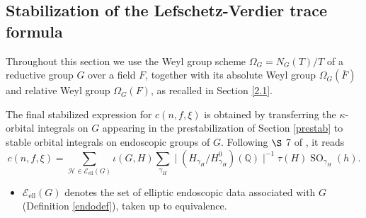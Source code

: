 \documentclass[11pt,a4paper]{article}
\newcommand{\Eell}{\mathcal{E}_{\mathrm{ell}}}
\theoremstyle{definition}
\theoremstyle{plain}
\theoremstyle{remark}
\theoremstyle{plain}
\DeclareMathOperator{\SO}{SO}
\begin{document}
\subsection{Stabilization of the Lefschetz-Verdier trace formula}\label{stab}
Throughout this section we use the Weyl group scheme $\Omega_G = N_G(T)/T$ of a reductive group $G$ over a field $F$, together with its absolute Weyl group $\Omega_G(\overline{F})$ and relative Weyl group $\Omega_G(F)$, as recalled in Section \ref{2.1}.

The final stabilized expression for $c(n,f,\xi)$ is obtained by transferring the $\kappa$-orbital integrals on $G$ appearing in the prestabilization of Section \ref{prestab} to stable orbital integrals on endoscopic groups of $G$. Following $\S$ 7 of \cite{MR1044820}, it reads
\begin{equation}\label{final}
    c(n,f,\xi) = \sum_{\mathcal{H} \in \Eell(G)} \iota (G,H) \sum_{\gamma_H} \mid (H_{\gamma_H}/H_{\gamma_H}^{0})(\mathbb{Q}) \mid ^{-1} \tau(H) \SO_{\gamma_H}(h).
\end{equation}

\begin{itemize}
    \item $\Eell(G)$ denotes the set of elliptic endoscopic data associated with $G$ (Definition \ref{endodef}), taken up to equivalence.
\end{itemize}
\end{document}
